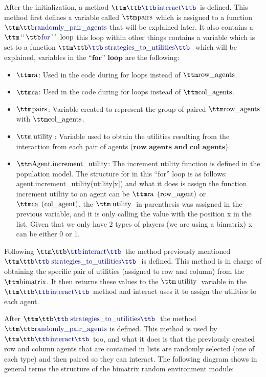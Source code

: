After the initialization, a method $\pythoninline{interact}$ is defined. This method first defines a variable called $\pythoninline{pairs}$ which is assigned to a function $\pythoninline{randomly\_pair\_agents}$ that will be explained later. It also contains a $\pythoninline{``for'' loop}$ this loop within other things contains a variable which is set to a function $\pythoninline{strategies\_to\_utilities}$ which will be explained, variables in the $\textbf{``for'' loop}$ are the following:

\begin{itemize}
\item $\pythoninline{ra}$: Used in the code during for loops instead of $\pythoninline{row\_agents}$.
\item $\pythoninline{ca}$: Used in the code during for loops instead of $\pythoninline{col\_agents}$.
\item $\pythoninline{pairs}$: Variable created to represent the group of paired $\pythoninline{row\_agents}$ with $\pythoninline{col\_agents}$.
\item $\pythoninline{utility}$: Variable used to obtain the utilities resulting from the interaction from each pair of agents ($\textbf{row\_agents and col\_agents}$).
\item $\pythoninline{Agent.increment\_utility}$: The increment utility function is defined in the population model. The structure for in this “for” loop is as follows:
\\ agent.increment\_utility(utility[x]) and what it does is assign the function increment utility to an agent can be $\pythoninline{ra (row\_agent)}$ or$\pythoninline{ ca (col\_agent)}$, the $\pythoninline{utility}$ in parenthesis was assigned in the previous variable, and it is only calling the value with the position x in the list. Given that we only have 2 types of players (we are using a bimatrix) x can be either 0 or 1.
\end{itemize}

Following $\pythoninline{interact}$ the method previously mentioned $\pythoninline{strategies\_to\_utilities}$ is defined. This method is in charge of obtaining the specific pair of utilities (assigned to row and column) from the $\pythoninline{bimatrix}$. It then returns these values to the $\pythoninline{utility}$ variable in the $\pythoninline{interact}$ method and interact uses it to assign the utilities to each agent.

After $\pythoninline{strategies\_to\_utilities}$ the method $\pythoninline{randomly\_pair\_agents}$ is defined. This method is used by $\pythoninline{interact}$ too, and what it does is that the previously created row and column agents that are contained in lists are randomly selected (one of each type) and then paired so they can interact. The following diagram shows in general terms the structure of the bimatrix random environment module:

